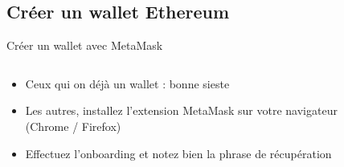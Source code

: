 \subsection{Créer un wallet Ethereum}

\begin{frame}{Créer un wallet avec MetaMask}
  \begin{columns}
    \begin{column}{0.7\textwidth}
      \begin{itemize}
        \item Ceux qui on déjà un wallet : bonne sieste
        \item Les autres, installez l'extension MetaMask sur votre navigateur (Chrome / Firefox)
        \item Effectuez l'onboarding et notez bien la phrase de récupération
      \end{itemize}
    \end{column}
    \begin{column}{0.25\textwidth}
      \begin{figure}
\end{figure}
\end{column}
\end{columns}
\end{frame}
